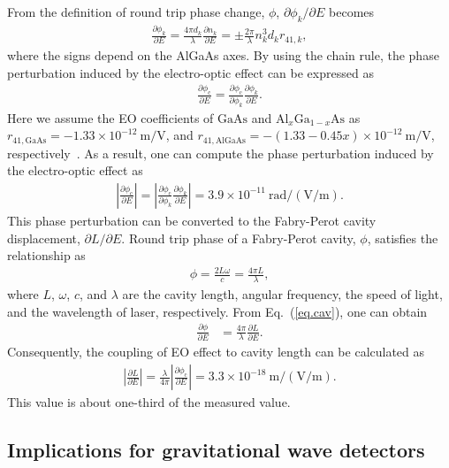 \documentclass[%
 reprint,
 superscriptaddress,
 amsmath,amssymb,
 aps,
]{revtex4-2}
\newcommand{\unit}[1]{\ \mathrm{#1}}
\begin{document}
From the definition of round trip phase change, $\phi$, $\partial\phi_k/\partial E$ becomes
\begin{align}
\frac{\partial\phi_k}{\partial E} = \frac{4\pi d_k}{\lambda}\frac{\partial n_k}{\partial E} = \pm\frac{2\pi}{\lambda}n_k^3d_kr_{41,k},
\end{align}
where the signs depend on the AlGaAs axes.
By using the chain rule, the phase perturbation induced by the electro-optic effect can be expressed as
\begin{align}
    \frac{\partial\phi_{\mathrm{c}}}{\partial E} = \frac{\partial\phi_{\mathrm{c}}}{\partial\phi_k}\frac{\partial\phi_k}{\partial E}.
\end{align}
Here we assume the EO coefficients of $\mathrm{GaAs}$ and $\mathrm{Al}_{x}\mathrm{Ga}_{1-x}\mathrm{As}$ as $r_{41,\mathrm{GaAs}}=-1.33\times10^{-12}\unit{m/V}$, and $r_{41,\mathrm{AlGaAs}}=-(1.33-0.45x)\times10^{-12}\unit{m/V}$, respectively~\cite{Adachi1985, Abernathy2014}.
As a result, one can compute the phase perturbation induced by the electro-optic effect as
\begin{align}
    \left|\frac{\partial\phi_{\mathrm{c}}}{\partial E}\right| = \left|\frac{\partial\phi_{\mathrm{c}}}{\partial\phi_k}\frac{\partial\phi_k}{\partial E}\right| = 3.9 \times 10^{-11}\unit{rad/(V/m)}.
\end{align}
This phase perturbation can be converted to the Fabry-Perot cavity displacement, $\partial L/\partial E$.
Round trip phase of a Fabry-Perot cavity, $\phi$, satisfies the relationship as
\begin{align}
    \phi = \frac{2L\omega}{c} = \frac{4\pi L}{\lambda},
    \label{eq.cav}
\end{align}
where $L$, $\omega$, $c$, and $\lambda$ are the cavity length, angular frequency, the speed of light, and the wavelength of laser, respectively.
From Eq.~(\ref{eq.cav}), one can obtain
\begin{align}
    \frac{\partial\phi}{\partial E} &= \frac{4\pi}{\lambda}\frac{\partial L}{\partial E}.
\end{align}
Consequently, the coupling of EO effect to cavity length can be calculated as
\begin{align}
    \left|\frac{\partial L}{\partial E}\right| = \frac{\lambda}{4\pi}\left|\frac{\partial\phi_{\mathrm{c}}}{\partial E}\right| = 3.3\times10^{-18}\unit{m/(V/m)}.
\end{align}
This value is about one-third of the measured value.

\subsection{Implications for gravitational wave detectors}
\end{document}
